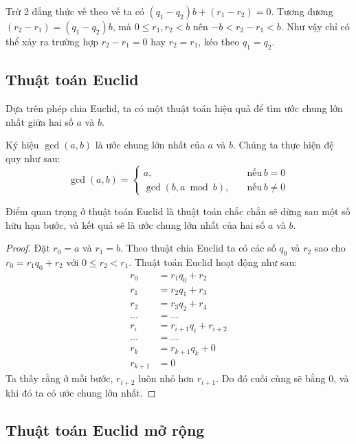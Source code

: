 Trừ 2 đẳng thức vế theo vế ta có $(q_1 - q_2) b + (r_1 - r_2) = 0$. Tương đương $(r_2 - r_1) = (q_1 - q_2) b$, mà $0 \leqslant r_1, r_2 < b$ nên $-b < r_2 - r_1 < b$. Như vậy chỉ có thể xảy ra trường hợp
$r_2 - r_1 = 0$ hay $r_2 = r_1$, kéo theo $q_1 = q_2$.

\subsection*{Thuật toán Euclid}

Dựa trên phép chia Euclid, ta có một thuật toán hiệu quả để tìm ước chung lớn nhất giữa hai số $a$ và $b$.

Ký hiệu $\gcd(a, b)$ là ước chung lớn nhất của $a$ và $b$. Chúng  ta thực hiện đệ quy như sau:
\begin{equation*}
    \gcd(a, b) = \begin{cases}
        a, \quad & \text{nếu}\,b = 0 \\
        \gcd(b, a \bmod b), \quad & \text{nếu}\,b \neq 0
    \end{cases} 
\end{equation*}

Điểm quan trọng ở thuật toán Euclid là thuật toán chắc chắn sẽ dừng sau một số hữu hạn bước, và kết quả sẽ là ước chung lớn nhất của hai số $a$ và $b$.

\begin{proof}
    Đặt $r_0 = a$ và $r_1 = b$. Theo thuật chia Euclid ta có các số $q_0$ và $r_2$ sao cho $r_0 = r_1 q_0 + r_2$ với $0 \leqslant r_2 < r_1$. Thuật toán Euclid hoạt động như sau:
    \begin{align*}
        r_0 & = r_1 q_0 + r_2 \\
        r_1 & = r_2 q_1 + r_3 \\
        r_2 & = r_3 q_2 + r_4 \\
        \ldots & = \ldots \\
        r_i & = r_{i+1} q_i + r_{i+2} \\
        \ldots & = \ldots \\
        r_k & = r_{k+1} q_k + 0 \\
        r_{k+1} & = 0
    \end{align*}
    Ta thấy rằng ở mỗi bước, $r_{i+2}$ luôn nhỏ hơn $r_{i+1}$. Do đó cuối cùng sẽ bằng 0, và khi đó ta có ước chung lớn nhất.
\end{proof}

\subsection*{Thuật toán Euclid mở rộng}

